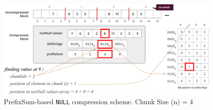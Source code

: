 



\begin{figure}
	\hfill\includegraphics[scale=0.70]{img/null2}\hspace*{\fill}
	\captionsetup{justification=centering}
	\caption{PrefixSum-based \texttt{NULL} compression scheme. Chunk Size (n) = 4}
	\label{fig:null2}
\end{figure}



